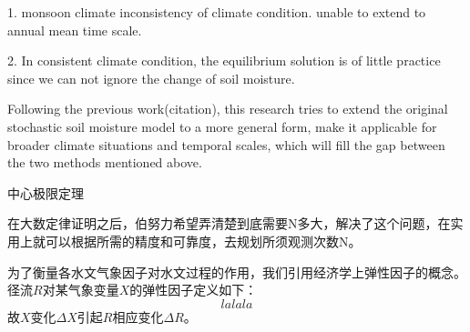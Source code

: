 1. monsoon climate inconsistency of climate condition. unable to extend to annual mean time scale.

2. In consistent climate condition, the equilibrium solution is of little practice since we can not ignore the change of soil moisture.

Following the previous work(citation), this research tries to extend the original stochastic soil moisture model to a more general form, make it  applicable for broader climate situations and temporal scales, which will fill the gap between the two methods mentioned above.


中心极限定理

在大数定律证明之后，伯努力希望弄清楚到底需要N多大，解决了这个问题，在实用上就可以根据所需的精度和可靠度，去规划所须观测次数N。
\iffalse
数学家不仅可以后验地认识世界，还可以用数学去估量他们的知识的限度。
如果我们能把一切事物永恒地观察下去，则我们终将发现：世间的一切事物都受到因果率的支配，而我们也注定会在种种极其纷纭杂乱的事项中认识到某种必然。 ——伯努力 《推测术》
\fi
 
为了衡量各水文气象因子对水文过程的作用，我们引用经济学上弹性因子的概念\cite{schaake1989development}。径流$R$对某气象变量$X$的弹性因子定义如下：
\begin{equation}
lalala
\end{equation}
故$X$变化$\Delta X$引起$R$相应变化$\Delta R$。
\fi
